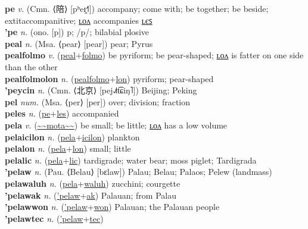 \textbf{pe} \textit{v.} (Cmn. ⟨陪⟩ [pʰeɪ̯˧˥])
accompany; come with; be together; be beside; 	extit{accompanitive}; \hyperref[pelon]{ʟᴏᴧ} accompanies \hyperref[peles]{ʟєꜱ} \label{pe} \\
\textbf{'pe} \textit{n.} (ono. [p])
p; /p/; bilabial plosive \label{'pe} \\
\textbf{peal} \textit{n.} (Msa. ⟨pear⟩ [pear])
pear; Pyrus \label{peal} \\
\textbf{pealfolmo} \textit{v.} (\hyperref[peal]{peal}+\hyperref[folmo]{folmo})
be pyriform; be pear-shaped; \hyperref[pealfolmolon]{ʟᴏᴧ} is fatter on one side than the other \label{pealfolmo} \\
\textbf{pealfolmolon} \textit{n.} (\hyperref[pealfolmo]{pealfolmo}+\hyperref[lon]{lon})
pyriform; pear-shaped \label{pealfolmolon} \\
\textbf{'peycin} \textit{n.} (Cmn. ⟨北京⟩ [pej˨˩˦t͡ɕiŋ˥])
Beijing; Peking \label{'peycin} \\
\textbf{pel} \textit{num.} (Msa. ⟨per⟩ [per])
over; division; fraction \label{pel} \\
\textbf{peles} \textit{n.} (\hyperref[pe]{pe}+\hyperref[les]{les})
accompanied \label{peles} \\
\textbf{pela} \textit{v.} (\hyperref[mota]{\~{}\~{}mota\~{}\~{}})
be small; be little; \hyperref[pelalon]{ʟᴏᴧ} has a low volume \label{pela} \\
\textbf{pelaicilon} \textit{n.} (\hyperref[pela]{pela}+\hyperref[icilon]{icilon})
plankton \label{pelaicilon} \\
\textbf{pelalon} \textit{n.} (\hyperref[pela]{pela}+\hyperref[lon]{lon})
small; little \label{pelalon} \\
\textbf{pelalic} \textit{n.} (\hyperref[pela]{pela}+\hyperref[lic]{lic})
tardigrade; water bear; moss piglet; Tardigrada \label{pelalic} \\
\textbf{'pelaw} \textit{n.} (Pau. ⟨Belau⟩ [bɛlaw])
Palau; Belau; Palaos; Pelew (landmass) \label{'pelaw} \\
\textbf{pelawaluh} \textit{n.} (\hyperref[pela]{pela}+\hyperref[waluh]{waluh})
zucchini; courgette \label{pelawaluh} \\
\textbf{'pelawak} \textit{n.} (\hyperref['pelaw]{'pelaw}+\hyperref[ak]{ak})
Palauan; from Palau \label{'pelawak} \\
\textbf{'pelawwon} \textit{n.} (\hyperref['pelaw]{'pelaw}+\hyperref[won]{won})
Palauan; the Palauan people \label{'pelawwon} \\
\textbf{'pelawtec} \textit{n.} (\hyperref['pelaw]{'pelaw}+\hyperref[tec]{tec})
